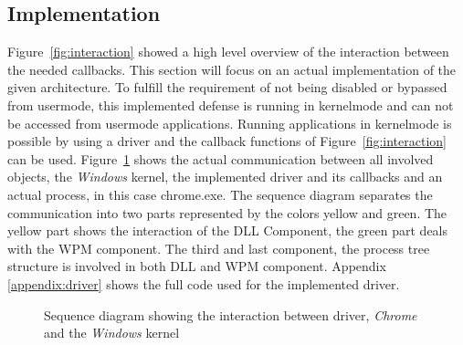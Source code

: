 \subsection{Implementation}
\label{sec:implementation} 
Figure~\ref{fig:interaction} showed a high level overview of the interaction between the needed callbacks. This section will focus on an actual implementation of the given architecture. To fulfill the requirement of not being disabled or bypassed from usermode, this implemented defense is running in kernelmode and can not be accessed from usermode applications. Running applications in kernelmode is possible by using a driver and the callback functions of Figure~\ref{fig:interaction} can be used. Figure~\ref{fig:sequence} shows the actual communication between all involved objects, the \emph{Windows} kernel, the implemented driver and its callbacks and an actual process, in this case chrome.exe. The sequence diagram separates the communication into two parts represented by the colors yellow and green. The yellow part shows the interaction of the \gls{DLL} Component, the green part deals with the \gls{WPM} component. The third and last component, the process tree structure is involved in both \gls{DLL} and \gls{WPM} component. Appendix \ref{appendix:driver} shows the full code used for the implemented driver.
\pagestyle{empty}
\begin{figure}[!p] 
 \centering
\caption{Sequence diagram showing the interaction between driver, \emph{Chrome} and the \emph{Windows} kernel}
\label{fig:sequence}
\end{figure}
\restoregeometry
\pagestyle{plain}
